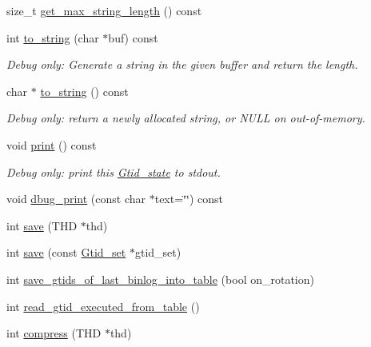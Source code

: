 \begin{DoxyCompactItemize}
size\+\_\+t \mbox{\hyperlink{classGtid__state_ad19fcbc6a9a1f112c4452d170ac28e05}{get\+\_\+max\+\_\+string\+\_\+length}} () const
\item 
\mbox{\label{classGtid__state_aa80c0cb53ce52933aa88ffcfb7601a0b}} 
int \mbox{\hyperlink{classGtid__state_aa80c0cb53ce52933aa88ffcfb7601a0b}{to\+\_\+string}} (char $\ast$buf) const
\begin{DoxyCompactList}\small\item\em Debug only\+: Generate a string in the given buffer and return the length. \end{DoxyCompactList}\item 
\mbox{\label{classGtid__state_a153260b2d824f4253a176f3a0504de1d}} 
char $\ast$ \mbox{\hyperlink{classGtid__state_a153260b2d824f4253a176f3a0504de1d}{to\+\_\+string}} () const
\begin{DoxyCompactList}\small\item\em Debug only\+: return a newly allocated string, or N\+U\+LL on out-\/of-\/memory. \end{DoxyCompactList}\item 
\mbox{\label{classGtid__state_a2735f6ca673acb5c382acb3bf1fef6ef}} 
void \mbox{\hyperlink{classGtid__state_a2735f6ca673acb5c382acb3bf1fef6ef}{print}} () const
\begin{DoxyCompactList}\small\item\em Debug only\+: print this \mbox{\hyperlink{classGtid__state}{Gtid\+\_\+state}} to stdout. \end{DoxyCompactList}\item 
void \mbox{\hyperlink{classGtid__state_a9c3eee2f214aabcf44b769f69c50c0eb}{dbug\+\_\+print}} (const char $\ast$text=\char`\"{}\char`\"{}) const
\item 
int \mbox{\hyperlink{classGtid__state_ae74cd18a8d4033037b733d8ed586b01a}{save}} (T\+HD $\ast$thd)
\item 
int \mbox{\hyperlink{classGtid__state_ab2f5c2e657b33be09503d912a30092e9}{save}} (const \mbox{\hyperlink{classGtid__set}{Gtid\+\_\+set}} $\ast$gtid\+\_\+set)
\item 
int \mbox{\hyperlink{classGtid__state_a8716c3a617dc4805a1d08ee7e77f3abb}{save\+\_\+gtids\+\_\+of\+\_\+last\+\_\+binlog\+\_\+into\+\_\+table}} (bool on\+\_\+rotation)
\item 
int \mbox{\hyperlink{classGtid__state_a66fe208121f5e1de1f180f10558d8fec}{read\+\_\+gtid\+\_\+executed\+\_\+from\+\_\+table}} ()
\item 
int \mbox{\hyperlink{classGtid__state_a731a0566657e636fb597085ca0ec87a4}{compress}} (T\+HD $\ast$thd)
\end{DoxyCompactItemize}



